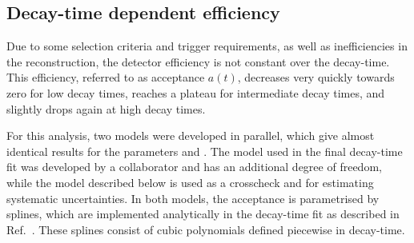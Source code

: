 \subsection{Decay-time dependent efficiency}
\label{sec:acceptance}

Due to \eg some selection criteria and trigger requirements, as well as inefficiencies in the \velo reconstruction, the detector efficiency is not constant over the \Bz decay-time.
This efficiency, referred to as acceptance $a(t)$, decreases very quickly towards zero for low decay times, reaches a plateau for intermediate decay times, and slightly drops again at high decay times.

For this analysis, two models were developed in parallel, which give almost identical results for the \CP parameters \Sf and \Sfbar.
The model used in the final decay-time fit was developed by a collaborator and has an additional degree of freedom, while the model described below is used as a crosscheck and for estimating systematic uncertainties.
In both models, the acceptance is parametrised by splines, which are implemented analytically in the decay-time fit as described in Ref.~\cite{Karbach:2014qba}.
These splines consist of cubic polynomials defined piecewise in decay-time.

